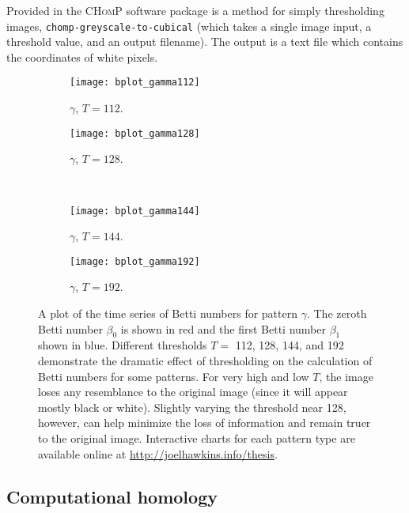 Provided in the \textsc{CHomP} software package is a method for simply thresholding images, \texttt{chomp-greyscale-to-cubical} (which takes a single image input, a threshold value, and an output filename). The output is a text file which contains the coordinates of white pixels.

\begin{sidewaysfigure}[p]
	\centering
	\begin{subfigure}[b]{0.45\textwidth}
                \texttt{[image: bplot\_gamma112]}
                \caption{$\gamma$, $T = 112$.}
                \label{fig:bplot_gamma112}
        \end{subfigure} \quad
	\begin{subfigure}[b]{0.45\textwidth}
                \texttt{[image: bplot\_gamma128]}
                \caption{$\gamma$, $T = 128$.}
                \label{fig:bplot_gamma128}
        \end{subfigure} \hfill \\
	\begin{subfigure}[b]{0.45\textwidth}
                \texttt{[image: bplot\_gamma144]}
                \caption{$\gamma$, $T = 144$.}
                \label{fig:bplot_gamma144}
       \end{subfigure} \quad
       \begin{subfigure}[b]{0.45\textwidth}
                \texttt{[image: bplot\_gamma192]}
                \caption{$\gamma$, $T = 192$.}
                \label{fig:bplot_gamma192}
        \end{subfigure}
        
        \caption{A plot of the time series of Betti numbers for pattern $\gamma$. The zeroth Betti number $\beta_0$ is shown in red and the first Betti number $\beta_1$ shown in blue. Different thresholds $T =$ 112, 128, 144, and 192 demonstrate the dramatic effect of thresholding on the calculation of Betti numbers for some patterns. For very high and low $T$, the image loses any resemblance to the original image (since it will appear mostly black or white). Slightly varying the threshold near 128, however, can help minimize the loss of information and remain truer to the original image. Interactive charts for each pattern type are available online at \url{http://joelhawkins.info/thesis}.} \label{fig:bplots_gamma}
\end{sidewaysfigure}

\newpage
\subsection{Computational homology} \label{sect:chomping}

